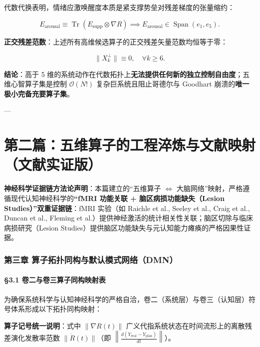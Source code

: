 \documentclass[11pt,a4paper,oneside]{ctexart}
\begin{document}
代数代换表明，情绪应激唤醒度本质是紧支撑势垒对残差梯度的张量缩约：

\begin{equation}
E_{\text{arousal}} \equiv \operatorname{Tr}\left( E_{\text{supp}} \otimes \nabla R \right) \implies E_{\text{arousal}} \in \operatorname{Span}(e_1, e_5).
\end{equation}

\textbf{正交残差范数}：上述所有高维候选算子的正交残差矢量范数均恒等于零：

\begin{equation}
\|X_k^\perp\| \equiv 0, \quad \forall k \ge 6.
\end{equation}

\textbf{结论}：高于 5 维的系统动作在代数拓扑上\textbf{无法提供任何新的独立控制自由度}；五维心智算子集是控制 $\mathcal{O}(N!)$ 复杂巨系统且阻止哥德尔与 Goodhart 崩溃的\textbf{唯一极小完备充要算子集}。


---


\part{第二篇：五维算子的工程淬炼与文献映射（文献实证版）}

\begin{notebox}
\textbf{神经科学证据链方法论声明}：本篇建立的“五维算子 $\Longleftrightarrow$ 大脑网络”映射，严格遵循现代认知神经科学的\textbf{“fMRI 功能关联 + 脑区病损功能缺失（Lesion Studies）”双重证据链}：fMRI 实验（如 Raichle et al., Seeley et al., Craig et al., Duncan et al., Fleming et al.）提供神经激活的统计相关性关联；脑区切除与临床病损研究（Lesion Studies）提供脑区功能缺失与元认知能力瘫痪的严格因果性证据。
\end{notebox}

\section{第三章 算子拓扑同构与默认模式网络（DMN）}

\subsection{§3.1 卷二与卷三算子同构映射表}

为确保系统科学与认知神经科学的严格自洽，卷二（系统层）与卷三（认知层）符号体系形成以下拓扑同构映射：


\begin{notebox}
\textbf{算子记号统一说明}：式中 $\|\nabla R(t)\|$ 广义代指系统状态在时间流形上的离散残差演化发散率范数 $\|\dot{R}(t)\|$（即 $\left\| \frac{d (Y_{\text{real}} - Y_{\text{plan}})}{dt} \right\|$）。
\end{notebox}
\end{document}

